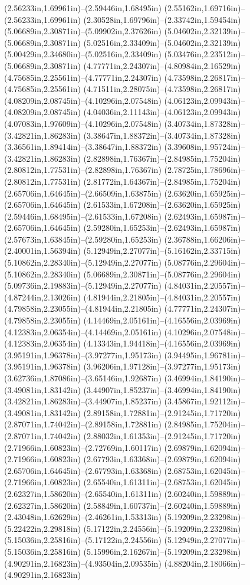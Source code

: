 (2.56233in,1.69961in)--(2.59446in,1.68495in) (2.55162in,1.69716in)--(2.56233in,1.69961in) (2.30528in,1.69796in)--(2.33742in,1.59454in) (5.06689in,2.30871in)--(5.09902in,2.37626in) (5.04602in,2.32139in)--(5.06689in,2.30871in) (5.02516in,2.33409in)--(5.04602in,2.32139in) (5.00429in,2.34680in)--(5.02516in,2.33409in) (5.03476in,2.23512in)--(5.06689in,2.30871in) (4.77771in,2.24307in)--(4.80984in,2.16529in) (4.75685in,2.25561in)--(4.77771in,2.24307in) (4.73598in,2.26817in)--(4.75685in,2.25561in) (4.71511in,2.28075in)--(4.73598in,2.26817in) (4.08209in,2.08745in)--(4.10296in,2.07548in) (4.06123in,2.09943in)--(4.08209in,2.08745in) (4.04036in,2.11143in)--(4.06123in,2.09943in) (4.07083in,1.97609in)--(4.10296in,2.07548in) (3.40734in,1.87328in)--(3.42821in,1.86283in) (3.38647in,1.88372in)--(3.40734in,1.87328in) (3.36561in,1.89414in)--(3.38647in,1.88372in) (3.39608in,1.95724in)--(3.42821in,1.86283in) (2.82898in,1.76367in)--(2.84985in,1.75204in) (2.80812in,1.77531in)--(2.82898in,1.76367in) (2.78725in,1.78696in)--(2.80812in,1.77531in) (2.81772in,1.64367in)--(2.84985in,1.75204in) (2.65706in,1.64645in)--(2.66509in,1.63875in) (2.63620in,1.65925in)--(2.65706in,1.64645in) (2.61533in,1.67208in)--(2.63620in,1.65925in) (2.59446in,1.68495in)--(2.61533in,1.67208in) (2.62493in,1.65987in)--(2.65706in,1.64645in) (2.59280in,1.65253in)--(2.62493in,1.65987in) (2.57673in,1.63845in)--(2.59280in,1.65253in) (2.36788in,1.66206in)--(2.40001in,1.56394in) (5.12949in,2.27077in)--(5.16162in,2.33715in) (5.10862in,2.28340in)--(5.12949in,2.27077in) (5.08776in,2.29604in)--(5.10862in,2.28340in) (5.06689in,2.30871in)--(5.08776in,2.29604in) (5.09736in,2.19883in)--(5.12949in,2.27077in) (4.84031in,2.20557in)--(4.87244in,2.13026in) (4.81944in,2.21805in)--(4.84031in,2.20557in) (4.79858in,2.23055in)--(4.81944in,2.21805in) (4.77771in,2.24307in)--(4.79858in,2.23055in) (4.14469in,2.05161in)--(4.16556in,2.03969in) (4.12383in,2.06354in)--(4.14469in,2.05161in) (4.10296in,2.07548in)--(4.12383in,2.06354in) (4.13343in,1.94418in)--(4.16556in,2.03969in) (3.95191in,1.96378in)--(3.97277in,1.95173in) (3.94495in,1.96781in)--(3.95191in,1.96378in) (3.96206in,1.97128in)--(3.97277in,1.95173in) (3.62736in,1.87086in)--(3.65146in,1.92687in) (3.46994in,1.84190in)--(3.49081in,1.83142in) (3.44907in,1.85237in)--(3.46994in,1.84190in) (3.42821in,1.86283in)--(3.44907in,1.85237in) (3.45867in,1.92112in)--(3.49081in,1.83142in) (2.89158in,1.72881in)--(2.91245in,1.71720in) (2.87071in,1.74042in)--(2.89158in,1.72881in) (2.84985in,1.75204in)--(2.87071in,1.74042in) (2.88032in,1.61353in)--(2.91245in,1.71720in) (2.71966in,1.60823in)--(2.72769in,1.60117in) (2.69879in,1.62094in)--(2.71966in,1.60823in) (2.67793in,1.63368in)--(2.69879in,1.62094in) (2.65706in,1.64645in)--(2.67793in,1.63368in) (2.68753in,1.62045in)--(2.71966in,1.60823in) (2.65540in,1.61311in)--(2.68753in,1.62045in) (2.62327in,1.58620in)--(2.65540in,1.61311in) (2.60240in,1.59889in)--(2.62327in,1.58620in) (2.58849in,1.60737in)--(2.60240in,1.59889in) (2.43048in,1.62629in)--(2.46261in,1.53313in) (5.19209in,2.23298in)--(5.22422in,2.29818in) (5.17122in,2.24556in)--(5.19209in,2.23298in) (5.15036in,2.25816in)--(5.17122in,2.24556in) (5.12949in,2.27077in)--(5.15036in,2.25816in) (5.15996in,2.16267in)--(5.19209in,2.23298in) (4.90291in,2.16823in)--(4.93504in,2.09535in) (4.88204in,2.18066in)--(4.90291in,2.16823in) 